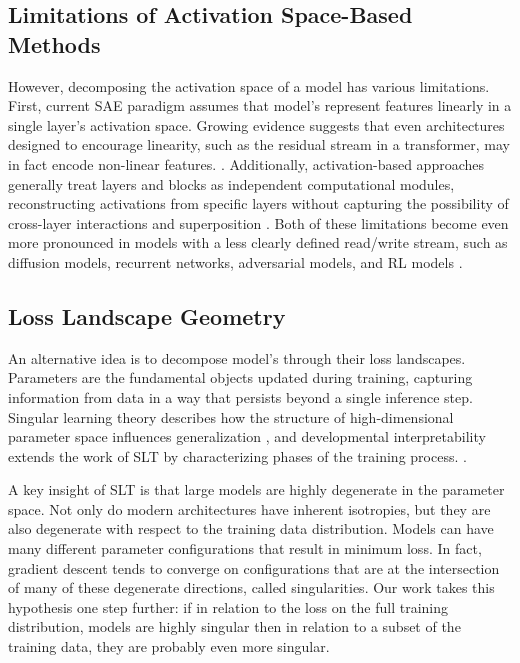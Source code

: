 \documentclass{article}
\theoremstyle{plain}
\theoremstyle{definition}
\theoremstyle{remark}
\begin{document}
\subsection{Limitations of Activation Space-Based Methods}

However, decomposing the activation space of a model has various limitations.  First, current SAE paradigm assumes that model's represent features linearly in a single layer's activation space. Growing evidence suggests that even architectures designed to encourage linearity, such as the residual stream in a transformer, may in fact encode non-linear features. \cite{engels2024not,engels2024decomposing}. Additionally, activation-based approaches generally treat layers and blocks as independent computational modules, reconstructing activations from specific layers without capturing the possibility of cross-layer interactions and superposition \cite{merullo2024talking,lindsey2024sparse}. Both of these limitations become even more pronounced in models with a less clearly defined read/write stream, such as diffusion models, recurrent networks, adversarial models, and RL models \cite{pascanu2013difficulty,goodfellow2014generative,ho2020denoising,mnih2015human}. 

\subsection{Loss Landscape Geometry}

An alternative idea is to decompose model’s through their loss landscapes. Parameters are the fundamental objects updated during training, capturing information from data in a way that persists beyond a single inference step. Singular learning theory describes how the structure of high-dimensional parameter space influences generalization \cite{watanabe2007almost,watanabe2000algebraic,watanabe2005algebraic, bushnaq2024using, davies2023unifying}, and developmental interpretability extends the work of SLT by characterizing phases of the training process. \cite{wang2024loss,hoogland2024developmental}. 

A key insight of SLT is that large models are highly degenerate \cite{wei2022deep} in the parameter space. Not only do modern architectures have inherent isotropies, but they are also degenerate with respect to the training data distribution. Models can have many different parameter configurations that result in minimum loss. In fact, gradient descent tends to converge on configurations that are at the intersection of many of these degenerate directions, called singularities.  Our work takes this hypothesis one step further: if in relation to the loss on the full training distribution, models are highly singular then in relation to a subset of the training data, they are probably even more singular. 
\end{document}
